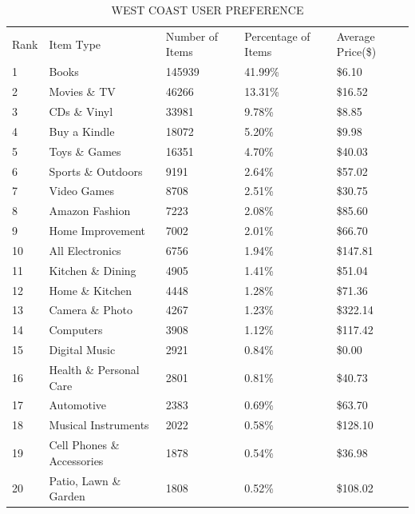 \begin{table}[!htbp]
\centering
\caption{WEST COAST USER PREFERENCE}
\label{tb:west}
\begin{adjustbox}{max width=.5\textwidth}
\begin{tabular}{lllll}
Rank & Item Type          & Number of Items & Percentage of Items & Average Price(\$) \\
1 & Books & 145939 & 41.99\% & \$6.10 \\
2 & Movies \& TV & 46266 & 13.31\% & \$16.52 \\
3 & CDs \& Vinyl & 33981 & 9.78\% & \$8.85 \\
4 & Buy a Kindle & 18072 & 5.20\% & \$9.98 \\
5 & Toys \& Games & 16351 & 4.70\% & \$40.03 \\
6 & Sports \& Outdoors & 9191 & 2.64\% & \$57.02 \\
7 & Video Games & 8708 & 2.51\% & \$30.75 \\
8 & Amazon Fashion & 7223 & 2.08\% & \$85.60 \\
9 & Home Improvement & 7002 & 2.01\% & \$66.70 \\
10 & All Electronics & 6756 & 1.94\% & \$147.81 \\
11 & Kitchen \& Dining & 4905 & 1.41\% & \$51.04 \\
12 & Home \& Kitchen & 4448 & 1.28\% & \$71.36 \\
13 & Camera \& Photo & 4267 & 1.23\% & \$322.14 \\
14 & Computers & 3908 & 1.12\% & \$117.42 \\
15 & Digital Music & 2921 & 0.84\% & \$0.00 \\
16 & Health \& Personal Care & 2801 & 0.81\% & \$40.73 \\
17 & Automotive & 2383 & 0.69\% & \$63.70 \\
18 & Musical Instruments & 2022 & 0.58\% & \$128.10 \\
19 & Cell Phones \& Accessories & 1878 & 0.54\% & \$36.98 \\
20 & Patio, Lawn \& Garden & 1808 & 0.52\% & \$108.02 \\
\end{tabular}
\end{adjustbox}
\end{table}

